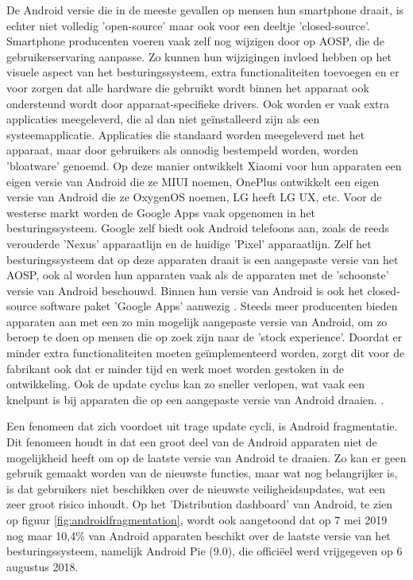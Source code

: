 De Android versie die in de meeste gevallen op mensen hun smartphone draait, is echter niet volledig 'open-source' maar ook voor een deeltje 'closed-source'. Smartphone producenten voeren vaak zelf nog wijzigen door op AOSP, die de gebruikerservaring aanpasse. Zo kunnen hun wijzigingen invloed hebben op het visuele aspect van het besturingssysteem, extra functionaliteiten toevoegen en er voor zorgen dat alle hardware die gebruikt wordt binnen het apparaat ook ondersteund wordt door apparaat-specifieke drivers. Ook worden er vaak extra applicaties meegeleverd, die al dan niet geïnstalleerd zijn als een systeemapplicatie. Applicaties die standaard worden meegeleverd met het apparaat, maar door gebruikers als onnodig bestempeld worden, worden 'bloatware' genoemd. Op deze manier ontwikkelt Xiaomi voor hun apparaten een eigen versie van Android die ze MIUI noemen, OnePlus ontwikkelt een eigen versie van Android die ze OxygenOS noemen, LG heeft LG UX, etc. Voor de westerse markt worden de Google Apps vaak opgenomen in het besturingssysteem. Google zelf biedt ook Android telefoons aan, zoals de reeds verouderde 'Nexus' apparaatlijn en de huidige 'Pixel' apparaatlijn. Zelf het besturingssysteem dat op deze apparaten draait is een aangepaste versie van het AOSP, ook al worden hun apparaten vaak als de apparaten met de 'schoonste' versie van Android beschouwd. Binnen hun versie van Android is ook het closed-source software paket 'Google Apps' aanwezig \autocite{torres_stockandroid}. Steeds meer producenten bieden apparaten aan met een zo min mogelijk aangepaste versie van Android, om zo beroep te doen op mensen die op zoek zijn naar de 'stock experience'. Doordat er minder extra functionaliteiten moeten geïmplementeerd worden, zorgt dit voor de fabrikant ook dat er minder tijd en werk moet worden gestoken in de ontwikkeling. Ook de update cyclus kan zo sneller verlopen, wat vaak een knelpunt is bij apparaten die op een aangepaste versie van Android draaien. \autocite{manik_slow-updates}. 

Een fenomeen dat zich voordoet uit trage update cycli, is Android fragmentatie. Dit fenomeen houdt in dat een groot deel van de Android apparaten niet de mogelijkheid heeft om op de laatste versie van Android te draaien. Zo kan er geen gebruik gemaakt worden van de nieuwste functies, maar wat nog belangrijker is, is dat gebruikers niet beschikken over de nieuwste veiligheidsupdates, wat een zeer groot risico inhoudt. Op het 'Distribution dashboard' van Android, te zien op figuur \ref{fig:androidfragmentation}, wordt ook aangetoond dat op 7 mei 2019 nog maar 10,4\% van Android apparaten beschikt over de laatste versie van het besturingssysteem, namelijk Android Pie (9.0), die officiëel werd vrijgegeven op 6 augustus 2018.

